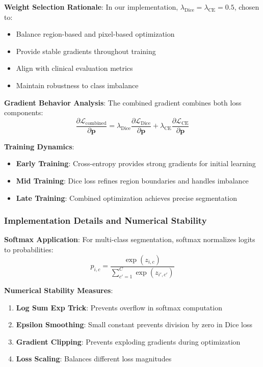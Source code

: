 \documentclass[12pt,a4paper]{article}
\begin{document}
\textbf{Weight Selection Rationale}:
In our implementation, $\lambda_{\text{Dice}} = \lambda_{\text{CE}} = 0.5$, chosen to:
\begin{itemize}
    \item Balance region-based and pixel-based optimization
    \item Provide stable gradients throughout training
    \item Align with clinical evaluation metrics
    \item Maintain robustness to class imbalance
\end{itemize}

\textbf{Gradient Behavior Analysis}:
The combined gradient combines both loss components:
\begin{equation}
\frac{\partial \mathcal{L}_{\text{combined}}}{\partial \mathbf{p}} = \lambda_{\text{Dice}} \frac{\partial \mathcal{L}_{\text{Dice}}}{\partial \mathbf{p}} + \lambda_{\text{CE}} \frac{\partial \mathcal{L}_{\text{CE}}}{\partial \mathbf{p}}
\end{equation}

\textbf{Training Dynamics}:
\begin{itemize}
    \item \textbf{Early Training}: Cross-entropy provides strong gradients for initial learning
    \item \textbf{Mid Training}: Dice loss refines region boundaries and handles imbalance
    \item \textbf{Late Training}: Combined optimization achieves precise segmentation
\end{itemize}

\subsubsection{Implementation Details and Numerical Stability}

\textbf{Softmax Application}:
For multi-class segmentation, softmax normalizes logits to probabilities:
\begin{equation}
p_{i,c} = \frac{\exp(z_{i,c})}{\sum_{c'=1}^C \exp(z_{i',c'})}
\end{equation}

\textbf{Numerical Stability Measures}:
\begin{enumerate}
    \item \textbf{Log Sum Exp Trick}: Prevents overflow in softmax computation
    \item \textbf{Epsilon Smoothing}: Small constant prevents division by zero in Dice loss
    \item \textbf{Gradient Clipping}: Prevents exploding gradients during optimization
    \item \textbf{Loss Scaling}: Balances different loss magnitudes
\end{enumerate}
\end{document}
